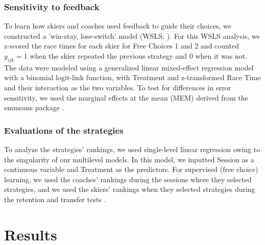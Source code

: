 \documentclass[pdflatex,sn-mathphys-num]{sn-jnl}%
\theoremstyle{thmstyleone}%
\theoremstyle{thmstyletwo}%
\theoremstyle{thmstylethree}%
\begin{document}
\subsubsection{Sensitivity to feedback}

To learn how skiers and coaches used feedback to guide their choices, we constructed a 'win-stay, lose-switch' model (WSLS; \cite{nowak_strategy_1993, worthy_comparison_2014, iyer_probing_2020}). For this WSLS analysis, we z-scored the race times for each skier for Free Choices 1 and 2 and counted \(y_{ijk}=1\) when the skier repeated the previous strategy and 0 when it was not. The data were modeled using a generalized linear mixed-effect regression model with a binomial logit-link function, with Treatment and z-transformed Race Time and their interaction as the two variables. To test for differences in error sensitivity, we used the marginal effects at the mean (MEM) derived from the emmeans package \cite{lenth_emmeans_2023}.


\subsubsection{Evaluations of the strategies}
To analyze the strategies' rankings, we used single-level linear regression owing to the singularity of our multilevel models. In this model, we inputted Session as a continuous variable and Treatment as the predictors. For supervised (free choice) learning, we used the coaches' rankings during the sessions where they selected strategies, and we used the skiers' rankings when they selected strategies during the retention and transfer tests .



\section{Results}
\end{document}
